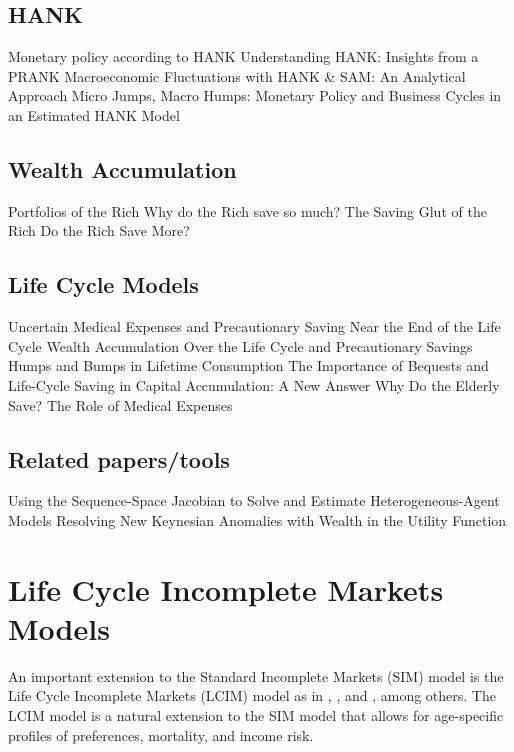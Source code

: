 \documentclass{article}
\begin{document}
\subsection{HANK}\label{HANK}

\cite{Kaplan_2018} Monetary policy according to HANK
\cite{Acharya_2020} Understanding HANK: Insights from a PRANK
\cite{Ravn_2020} Macroeconomic Fluctuations with HANK \& SAM: An Analytical Approach
\cite{Auclert_2020} Micro Jumps, Macro Humps: Monetary Policy and Business Cycles in an Estimated HANK Model

\subsection{Wealth Accumulation}\label{Wealth Accumulation}

\cite{Carroll_2000} Portfolios of the Rich
\cite{Carroll_1998} Why do the Rich save so much?
\cite{Mian_2020} The Saving Glut of the Rich
\cite{Dynan_2004} Do the Rich Save More?

\subsection{Life Cycle Models}\label{Life Cycle Models}

\cite{Palumbo_1999} Uncertain Medical Expenses and Precautionary Saving Near the End of the Life Cycle
\cite{Cagetti_2003} Wealth Accumulation Over the Life Cycle and Precautionary Savings
\cite{Attanasio_1999}  Humps and Bumps in Lifetime Consumption
\cite{Dynan_2002} The Importance of Bequests and Life-Cycle Saving in Capital Accumulation: A New Answer
\cite{De_Nardi_2010} Why Do the Elderly Save? The Role of Medical Expenses

\subsection{Related papers/tools}\label{Related papers/tools}

Using the Sequence-Space Jacobian to Solve and Estimate Heterogeneous-Agent Models
\cite{Michaillat_2021} Resolving New Keynesian Anomalies with Wealth in the Utility Function

\section{Life Cycle Incomplete Markets Models}\label{Life Cycle Incomplete Markets Models}

An important extension to the Standard Incomplete Markets (SIM) model is the Life Cycle Incomplete Markets (LCIM) model as in \cite{Cagetti_2003}, \cite{Gourinchas_2002}, and \cite{Palumbo_1999}, among others. The LCIM model is a natural extension to the SIM model that allows for age-specific profiles of preferences, mortality, and income risk.
\end{document}
